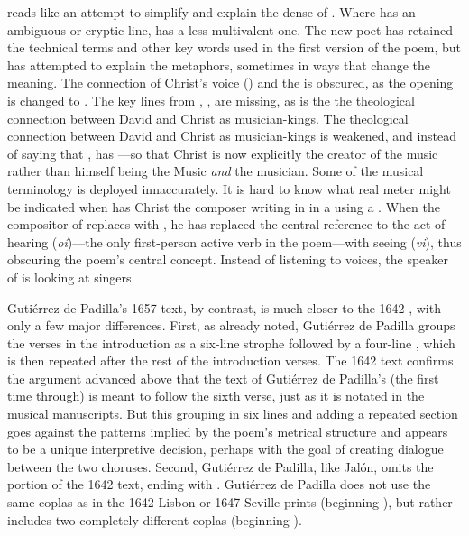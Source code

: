 reads like an attempt to simplify and explain the dense
 of .
Where  has an ambiguous or cryptic line,  has a
less multivalent one. 
The new poet has retained the technical terms and other key words used in the
first version of the poem, but has attempted to explain the metaphors, sometimes
in ways that change the meaning.
The connection of Christ's voice () and the  is obscured, as the opening is changed to .
The key lines from , , are missing, as is the the theological connection between
David and Christ as musician-kings.
The theological connection between David and Christ as musician-kings is
weakened, and instead of saying that ,
 has ---so that Christ is now
explicitly the creator of the music rather than himself being the Music
\emph{and} the musician.
Some of the musical terminology is deployed innaccurately. 
It is hard to know what real meter might be indicated when 
has Christ the composer writing in  in a
 using a .
When the compositor of  replaces  with , he has replaced the central
reference to the act of hearing (\emph{oí})---the only first-person active verb
in the poem---with seeing (\emph{vi}), thus obscuring the poem's central
concept. 
Instead of listening to voices, the speaker of  is looking at
singers.


Gutiérrez de Padilla's 1657 text, by contrast, is much closer to the 1642
, with only a few major differences.
First, as already noted, Gutiérrez de Padilla groups the verses in the
introduction as a six-line strophe followed by a four-line ,
which is then repeated after the rest of the introduction verses.
The 1642 text confirms the argument advanced above that the text of Gutiérrez de
Padilla's  (the first time through) is meant to follow the sixth
verse, just as it is notated in the musical manuscripts.
But this grouping in six lines and adding a repeated section goes against the
patterns implied by the poem's metrical structure and appears to be a unique
interpretive decision, perhaps with the goal of creating dialogue between the
two choruses.
Second, Gutiérrez de Padilla, like Jalón, omits the  portion of the
1642 text, ending with .
Gutiérrez de Padilla does not use the same coplas as in the 1642 Lisbon or 1647
Seville prints (beginning ), but rather includes
two completely different coplas (beginning ).

